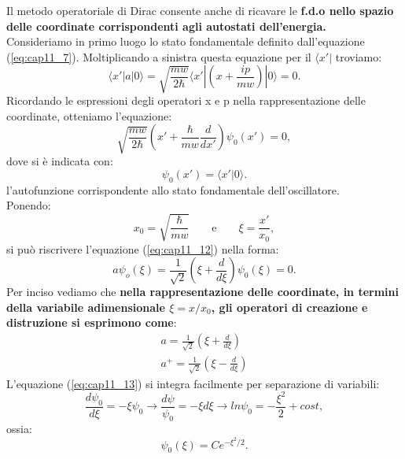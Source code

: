 \documentclass[a4paper,12pt,oneside]{book}
\begin{document}
 Il metodo operatoriale di Dirac consente anche di ricavare le \textbf{f.d.o nello spazio delle coordinate corrispondenti agli autostati dell'energia.}\\
 Consideriamo in primo luogo lo stato fondamentale definito dall'equazione (\ref{eq:cap11_7}). Moltiplicando a sinistra questa equazione per il $\langle x'|$ troviamo:
\begin{equation}
\langle x'|a|0 \rangle= \sqrt{\frac{mw}{2\hbar}}\langle x'|(x+\frac{ip}{mw})|0 \rangle=0.
\end{equation}
Ricordando le espressioni degli operatori x e p nella rappresentazione delle coordinate, otteniamo l'equazione:
\begin{equation} \label{eq:cap11_12}
\sqrt{\frac{mw}{2\hbar}}(x'+\frac{\hbar}{mw}\frac{d}{dx'})\psi_0(x')=0,
\end{equation}
dove si è indicata con:
\begin{equation}
\psi_0(x')=\langle x'|0 \rangle.
\end{equation}
l'autofunzione corrispondente allo stato fondamentale dell'oscillatore. \\
Ponendo:
\begin{equation}
x_0=\sqrt{\frac{\hbar}{mw}} \qquad \textrm{e} \qquad \xi=\frac{x'}{x_0},
\end{equation}
si può riscrivere l'equazione (\ref{eq:cap11_12}) nella forma:
\begin{equation}  \label{eq:cap11_13}
a\psi_o(\xi)=\frac{1}{\sqrt{2}}(\xi+\frac{d}{d\xi})\psi_0(\xi)=0.
\end{equation}
Per inciso vediamo che \textbf{nella rappresentazione delle coordinate, in termini della variabile adimensionale $\xi=x/x_0$, gli operatori di creazione e distruzione si esprimono come}:
\begin{equation}    \label{eq:cap11_14}
\begin{split}
	a=\frac{1}{\sqrt{2}} (\xi+\frac{d}{d\xi}) \\
	a^+=\frac{1}{\sqrt{2}} (\xi-\frac{d}{d\xi}) 
\end{split} \end{equation}
 L'equazione (\ref{eq:cap11_13}) si integra facilmente per separazione di variabili:
\begin{equation}
\frac{d\psi_0}{d\xi}=-\xi\psi_0 \rightarrow \frac{d\psi}{\psi_0}=-\xi d\xi \rightarrow ln\psi_0=-\frac{\xi^2}{2}+cost,
\end{equation}
ossia:
\begin{equation}
\psi_0(\xi)=Ce^{-\xi^2/2}.
\end{equation}
\end{document}
